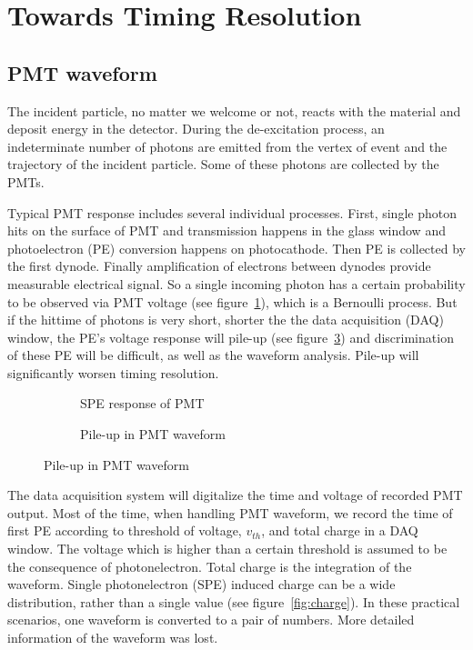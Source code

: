 \section{Towards Timing Resolution} %
\label{sec:toyMC}

\subsection{PMT waveform}

The incident particle, no matter we welcome or not, reacts with the material and deposit energy in the detector. During the de-excitation process, an indeterminate number of photons are emitted from the vertex of event and the trajectory of the incident particle. Some of these photons are collected by the PMTs. 

Typical PMT response includes several individual processes. First, single photon hits on the surface of PMT and transmission happens in the glass window and photoelectron (PE) conversion happens on photocathode. Then PE is collected by the first dynode. Finally amplification of electrons between dynodes provide measurable electrical signal. So a single incoming photon has a certain probability to be observed via PMT voltage (see figure~\ref{fig:spe}), which is a Bernoulli process. But if the hittime of photons is very short, shorter the the data acquisition (DAQ) window, the PE's voltage response will pile-up (see figure~\ref{fig:pile}) and discrimination of these PE will be difficult, as well as the waveform analysis. Pile-up will significantly worsen timing resolution. 

\begin{figure}[H]
\begin{minipage}[b]{.5\textwidth}
\begin{figure}[H]
    \centering
    \resizebox{\textwidth}{!}{}
    \caption{\label{fig:spe} SPE response of PMT}
\end{figure}
\end{minipage}
\begin{minipage}[b]{.5\textwidth}
\begin{figure}[H]
    \centering
    \resizebox{\textwidth}{!}{}
    \caption{\label{fig:pile} Pile-up in PMT waveform}
\end{figure}
\end{minipage}
\end{figure}

The data acquisition system will digitalize the time and voltage of recorded PMT output. Most of the time, when handling PMT waveform, we record the time of first PE according to threshold of voltage, $v_{th}$, and total charge in a DAQ window. The voltage which is higher than a certain threshold is assumed to be the consequence of photonelectron. Total charge is the integration of the waveform. Single photonelectron (SPE) induced charge can be a wide distribution, rather than a single value (see figure~\ref{fig:charge}). In these practical scenarios, one waveform is converted to a pair of numbers. More detailed information of the waveform was lost. 

